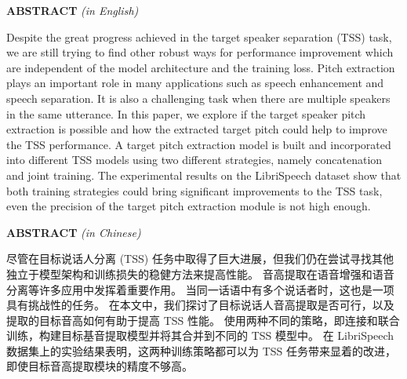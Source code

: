
\textbf{ABSTRACT} \emph{(in English)}

Despite the great progress achieved in the target speaker separation (TSS) task, we are still trying to find other robust ways for performance improvement which are independent of the model architecture and the training loss.
Pitch extraction plays an important role in many applications such as speech enhancement and speech separation.
It is also a challenging task when there are multiple speakers in the same utterance.
In this paper, we explore if the target speaker pitch extraction is possible and how the extracted target pitch could help to improve the TSS performance.
A target pitch extraction model is built and incorporated into different TSS models using two different strategies, namely concatenation and joint training.
The experimental results on the LibriSpeech dataset show that both training strategies could bring significant improvements to the TSS task, even the precision of the target pitch extraction module is not high enough.

\textbf{ABSTRACT} \emph{(in Chinese)}

\begin{CJK}{UTF8}{gbsn}
    尽管在目标说话人分离 (TSS) 任务中取得了巨大进展，但我们仍在尝试寻找其他独立于模型架构和训练损失的稳健方法来提高性能。
    音高提取在语音增强和语音分离等许多应用中发挥着重要作用。
    当同一话语中有多个说话者时，这也是一项具有挑战性的任务。
    在本文中，我们探讨了目标说话人音高提取是否可行，以及提取的目标音高如何有助于提高 TSS 性能。
    使用两种不同的策略，即连接和联合训练，构建目标基音提取模型并将其合并到不同的 TSS 模型中。
    在 LibriSpeech 数据集上的实验结果表明，这两种训练策略都可以为 TSS 任务带来显着的改进，即使目标音高提取模块的精度不够高。
\end{CJK}
